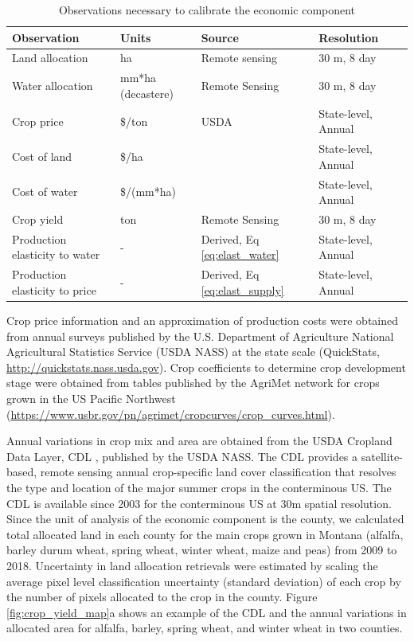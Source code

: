 \begin{table}
\caption{Observations necessary to calibrate the economic component}
\centering
\label{tab:econ_obs_sources}
\begin{tabular}{@{}lllll@{}}
\toprule
Observation                    & Units      & Source         & Resolution  \\ \midrule
Land allocation                & ha         & Remote sensing \citep{USDAa} & 30 m, 8 day \\
Water allocation               & mm*ha (decastere)      & Remote Sensing \citep{He2019} & 30 m, 8 day  \\
Crop price                     & \$/ton     & USDA           & State-level, Annual  \\
Cost of land                   & \$/ha      &                & State-level, Annual  \\
Cost of water                  & \$/(mm*ha) &                & State-level, Annual  \\
Crop yield                     & ton        & Remote Sensing \citep{He2018} & 30 m, 8 day   \\
Production elasticity to water & -          & Derived, Eq \eqref{eq:elast_water}        & State-level, Annual  \\
Production elasticity to price & -          & Derived, Eq \eqref{eq:elast_supply}        & State-level, Annual \\ \bottomrule
\end{tabular}
\end{table}

Crop price information and an approximation of production costs were obtained from annual surveys published by the U.S. Department of Agriculture National Agricultural Statistics Service (USDA NASS) at the state scale (QuickStats, \url{http://quickstats.nass.usda.gov}). Crop coefficients to determine crop development stage were obtained from tables published by the AgriMet network for crops grown in the US Pacific Northwest (\url{https://www.usbr.gov/pn/agrimet/cropcurves/crop_curves.html}). 

Annual variations in crop mix and area are obtained from the USDA Cropland Data Layer, CDL \citep{USDANASS2015}, published by the USDA NASS. The CDL provides a satellite-based, remote sensing annual crop-specific land cover classification that resolves the type and location of the major summer crops in the conterminous US. The CDL is available since 2003 for the conterminous US at 30m spatial resolution. Since the unit of analysis of the economic component is the county, we calculated total allocated land in each county for the main crops grown in Montana (alfalfa, barley  durum wheat, spring wheat, winter wheat, maize and peas) from 2009 to 2018. Uncertainty in land allocation retrievals were estimated by scaling the average pixel level classification uncertainty (standard deviation) of each crop by the number of pixels allocated to the crop in the county. Figure \ref{fig:crop_yield_map}a shows an example of the CDL and the annual variations in allocated area for alfalfa, barley, spring wheat, and winter wheat in two counties. 

